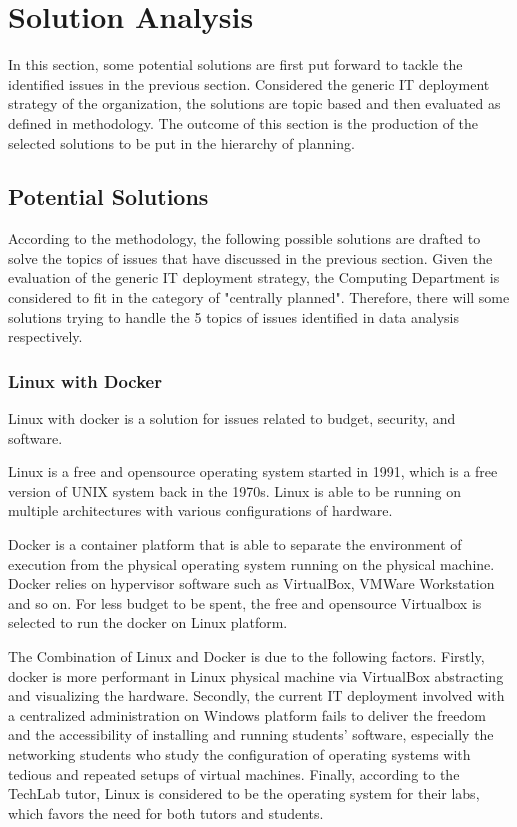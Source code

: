 
\section{Solution Analysis}

In this section, some potential solutions are first put forward to tackle the identified issues in the previous section. Considered the generic IT deployment strategy of the organization, the solutions are topic based and then evaluated as defined in methodology. The outcome of this section is the production of the selected solutions to be put in the hierarchy of planning.

\subsection{Potential Solutions}

According to the methodology, the following possible solutions are drafted to solve the topics of issues that have discussed in the previous section. Given the evaluation of the generic IT deployment strategy, the Computing Department is considered to fit in the category of "centrally planned". Therefore, there will some solutions trying to handle the 5 topics of issues identified in data analysis respectively.

\subsubsection{Linux with Docker}
Linux with docker is a solution for issues related to budget, security, and software.

Linux is a free and opensource operating system started in 1991, which is a free version of UNIX system back in the 1970s. Linux is able to be running on multiple architectures with various configurations of hardware.

Docker is a container platform that is able to separate the environment of execution from the physical operating system running on the physical machine. Docker relies on hypervisor software such as VirtualBox, VMWare Workstation and so on. For less budget to be spent, the free and opensource Virtualbox is selected to run the docker on Linux platform.

The Combination of Linux and Docker is due to the following factors. Firstly, docker is more performant in Linux physical machine via VirtualBox abstracting and visualizing the hardware. Secondly, the current IT deployment involved with a centralized administration on Windows platform fails to deliver the freedom and the accessibility of installing and running students' software, especially the networking students who study the configuration of operating systems with tedious and repeated setups of virtual machines. Finally, according to the TechLab tutor, Linux is considered to be the operating system for their labs, which favors the need for both tutors and students.

